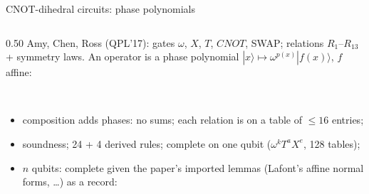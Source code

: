 \begin{frame}{CNOT-dihedral circuits: phase polynomials \New}
\begin{columns}[c]
\begin{column}{0.50\textwidth}
\renewcommand{\AgdaCodeStyle}{\scriptsize}
\small Amy, Chen, Ross (QPL'17): gates $\omega$, $X$, $T$, $CNOT$, SWAP;
relations $R_1$--$R_{13}$ + symmetry laws. An operator is a \alert{phase
polynomial} $|x\rangle\mapsto\omega^{p(x)}|f(x)\rangle$, $f$ affine:
\begin{code}%
\>[0]\AgdaSpace{}%
\AgdaSymbol{:}\AgdaSpace{}%
\AgdaSpace{}%
\AgdaSpace{}%
\<%
\\
\>[0]\AgdaSpace{}%
\AgdaSpace{}%
\AgdaSymbol{=}\AgdaSpace{}%
\AgdaSpace{}%
\AgdaSpace{}%
\AgdaSpace{}%
\AgdaSpace{}%
\AgdaSpace{}%
\AgdaSpace{}%
\<%
\end{code}
\begin{itemize}
  \small
  \item composition adds phases: \alert{no sums}; each relation is 
        on a table of $\le16$ entries;
  \item soundness; 24 + 4 derived rules; \alert{complete on one qubit}
        ($\omega^kT^aX^e$, 128 tables);
  \item $n$ qubits: complete given the paper's imported lemmas (Lafont's
        affine normal forms, \ldots) as a record:
\end{itemize}
\begin{code}%
\>[0]\AgdaSpace{}%
\AgdaSpace{}%
\AgdaSymbol{(}\AgdaSpace{}%
\AgdaSymbol{:}\AgdaSpace{}%
\AgdaSpace{}%
\AgdaSymbol{)}\AgdaSpace{}%
\<%
\\
\>[0][@{}l@{\AgdaIndent{0}}]%
\>[2]\AgdaSpace{}%
\AgdaSymbol{:}\AgdaSpace{}%
\AgdaSpace{}%
\AgdaSymbol{\{}\AgdaSpace{}%
\AgdaSpace{}%
\AgdaSymbol{:}\AgdaSpace{}%
\AgdaSpace{}%
\AgdaSymbol{\}}\AgdaSpace{}%
\AgdaSpace{}%
\AgdaSpace{}%
\AgdaSpace{}%
\AgdaSpace{}%
\AgdaSpace{}%
\AgdaSpace{}%
\AgdaSpace{}%

\end{code}
\end{column}
\end{columns}
\end{frame}
